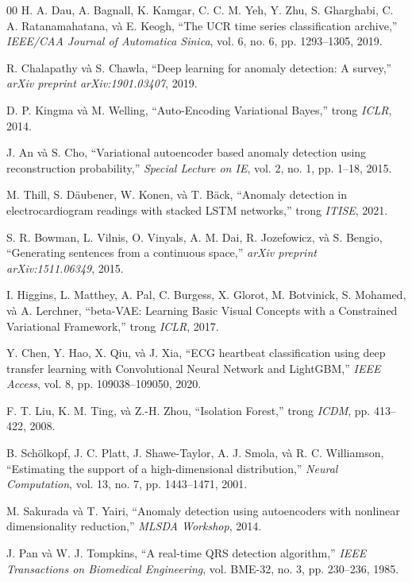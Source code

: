 \documentclass[conference]{IEEEtran}
\begin{document}
\begin{thebibliography}{00}
H. A. Dau, A. Bagnall, K. Kamgar, C. C. M. Yeh, Y. Zhu, S. Gharghabi, C. A. Ratanamahatana, và E. Keogh, ``The UCR time series classification archive,'' \textit{IEEE/CAA Journal of Automatica Sinica}, vol. 6, no. 6, pp. 1293--1305, 2019.

R. Chalapathy và S. Chawla, ``Deep learning for anomaly detection: A survey,'' \textit{arXiv preprint arXiv:1901.03407}, 2019.

D. P. Kingma và M. Welling, ``Auto-Encoding Variational Bayes,'' trong \textit{ICLR}, 2014.

J. An và S. Cho, ``Variational autoencoder based anomaly detection using reconstruction probability,'' \textit{Special Lecture on IE}, vol. 2, no. 1, pp. 1--18, 2015.

M. Thill, S. Däubener, W. Konen, và T. Bäck, ``Anomaly detection in electrocardiogram readings with stacked LSTM networks,'' trong \textit{ITISE}, 2021.

S. R. Bowman, L. Vilnis, O. Vinyals, A. M. Dai, R. Jozefowicz, và S. Bengio, ``Generating sentences from a continuous space,'' \textit{arXiv preprint arXiv:1511.06349}, 2015.

I. Higgins, L. Matthey, A. Pal, C. Burgess, X. Glorot, M. Botvinick, S. Mohamed, và A. Lerchner, ``beta-VAE: Learning Basic Visual Concepts with a Constrained Variational Framework,'' trong \textit{ICLR}, 2017.

Y. Chen, Y. Hao, X. Qiu, và J. Xia, ``ECG heartbeat classification using deep transfer learning with Convolutional Neural Network and LightGBM,'' \textit{IEEE Access}, vol. 8, pp. 109038--109050, 2020.

F. T. Liu, K. M. Ting, và Z.-H. Zhou, ``Isolation Forest,'' trong \textit{ICDM}, pp. 413--422, 2008.

B. Schölkopf, J. C. Platt, J. Shawe-Taylor, A. J. Smola, và R. C. Williamson, ``Estimating the support of a high-dimensional distribution,'' \textit{Neural Computation}, vol. 13, no. 7, pp. 1443--1471, 2001.

M. Sakurada và T. Yairi, ``Anomaly detection using autoencoders with nonlinear dimensionality reduction,'' \textit{MLSDA Workshop}, 2014.

J. Pan và W. J. Tompkins, ``A real-time QRS detection algorithm,'' \textit{IEEE Transactions on Biomedical Engineering}, vol. BME-32, no. 3, pp. 230--236, 1985.


\end{thebibliography}
\end{document}
